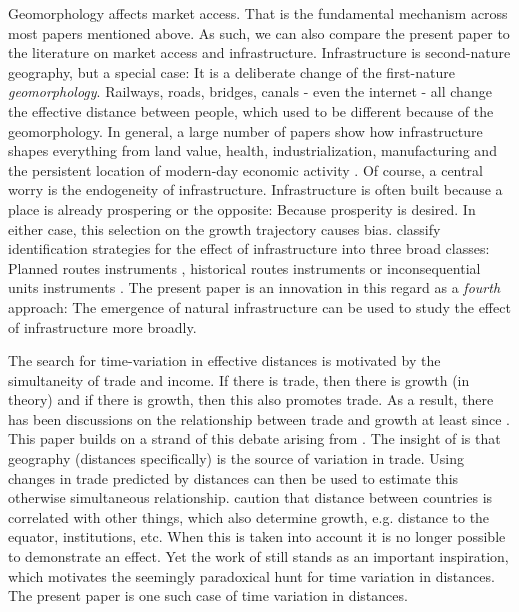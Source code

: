 \documentclass[11pt]{article}
\begin{document}
Geomorphology affects market access. That is the fundamental mechanism across most papers mentioned above. As such, we can also compare the present paper to the literature on market access and infrastructure. Infrastructure is second-nature geography, but a special case: It is a deliberate change of the first-nature \textit{geomorphology}. Railways, roads, bridges, canals - even the internet - all change the effective distance between people, which used to be different because of the geomorphology. In general, a large number of papers show how infrastructure shapes everything from land value, health, industrialization, manufacturing and the persistent location of modern-day economic activity \citep{Donaldson2016, Berger2017, Berger2019a, Hornbeck2019, Bogart2019, Zimran2020a, Bogart2022, Hornbeck2024, Hornung2015}. Of course, a central worry is the endogeneity of infrastructure. Infrastructure is often built because a place is already prospering or the opposite: Because prosperity is desired. In either case, this selection on the growth trajectory causes bias. \cite{Redding2015} classify identification strategies for the effect of infrastructure into three broad classes: Planned routes instruments \citep{BaumSnow2007}, historical routes instruments \citep{Duranton2012} or inconsequential units instruments \citep{Berger2017}. The present paper is an innovation in this regard as a \textit{fourth} approach: The emergence of natural infrastructure can be used to study the effect of infrastructure more broadly. 

The search for time-variation in effective distances is motivated by the simultaneity of trade and income. If there is trade, then there is growth (in theory) and if there is growth, then this also promotes trade. As a result, there has been discussions on the relationship between trade and growth at least since \cite{ricardo1817principles}. This paper builds on a strand of this debate arising from \cite{Frankel1999}. The insight of \cite{Frankel1999} is that geography (distances specifically) is the source of variation in trade. Using changes in trade predicted by distances can then be used to estimate this otherwise simultaneous relationship. \cite{Rodriguez2001} caution that distance between countries is correlated with other things, which also determine growth, e.g. distance to the equator, institutions, etc. When this is taken into account it is no longer possible to demonstrate an effect. Yet the work of \cite{Frankel1999} still stands as an important inspiration, which motivates the seemingly paradoxical hunt for time variation in distances. The present paper is one such case of time variation in distances.
\end{document}
